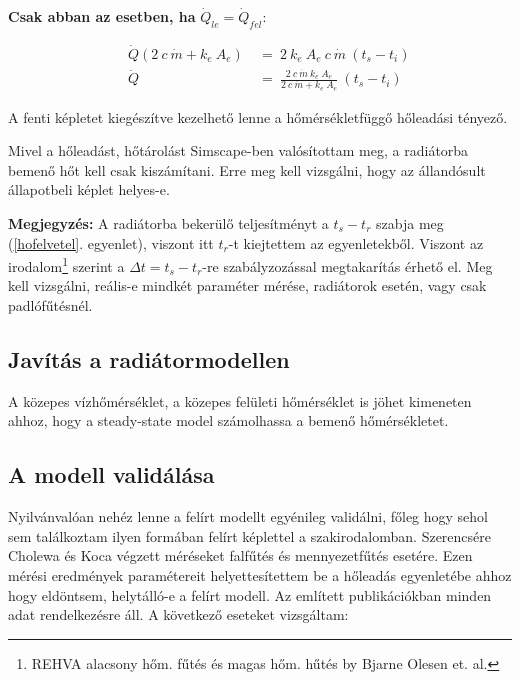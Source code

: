 \textbf{Csak abban az esetben, ha} $\dot Q_{le}=\dot Q_{fel}$:



\begin{equation} \label{holeadas4}
\begin{aligned}
~~~~~~\dot Q (2 ~ c ~ \dot{m} + k_e ~ A_e) & ~=~ 2 ~ k_e ~ A_e ~ c~ \dot{m} ~(t_s-t_i) \\[18pt]
~~~~~~\dot Q &~=~ \frac{2~c~\dot{m}~k_e~A_e}{2 ~c ~ \dot{m} + k_e ~ A_e}~(t_s-t_i)
\end{aligned}
\end{equation}

A fenti képletet kiegészítve kezelhető lenne a hőmérsékletfüggő hőleadási tényező.

Mivel a hőleadást, hőtárolást Simscape-ben valósítottam meg, a radiátorba bemenő hőt kell csak kiszámítani. Erre meg kell vizsgálni, hogy az állandósult állapotbeli képlet helyes-e.

\begin{formal}
	\textbf{Megjegyzés:} A radiátorba bekerülő teljesítményt a $t_s-t_r$ szabja meg (\ref{hofelvetel}. egyenlet), viszont itt $t_r$-t kiejtettem az egyenletekből. Viszont az irodalom\footnote{REHVA alacsony hőm. fűtés és magas hőm. hűtés by Bjarne Olesen et. al.} szerint a $\Delta t= t_s-t_r$-re szabályzozással megtakarítás érhető el. Meg kell vizsgálni, reális-e mindkét paraméter mérése, radiátorok esetén, vagy csak padlófűtésnél.
\end{formal}

\subsection{Javítás a radiátormodellen}

A közepes vízhőmérséklet, a közepes felületi hőmérséklet is jöhet kimeneten ahhoz, hogy a steady-state model számolhassa a bemenő hőmérsékletet.

\subsection{A modell validálása}

Nyilvánvalóan nehéz lenne a felírt modellt egyénileg validálni, főleg hogy sehol sem találkoztam ilyen formában felírt képlettel a szakirodalomban. Szerencsére Cholewa \cite{CHOLEWA2013599} és Koca \cite{Koca} végzett méréseket falfűtés és mennyezetfűtés esetére. Ezen mérési eredmények paramétereit helyettesítettem be a hőleadás egyenletébe ahhoz hogy eldöntsem, helytálló-e a felírt modell. Az említett publikációkban minden adat rendelkezésre áll. A következő eseteket vizsgáltam:


